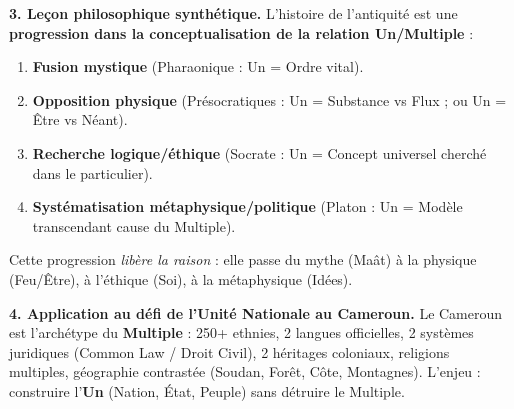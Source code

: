 \documentclass[11pt]{article}
\begin{document}
\begin{exoresolu}
\textbf{3. Leçon philosophique synthétique.}
L'histoire de l'antiquité est une \textbf{progression dans la conceptualisation de la relation Un/Multiple} :
\begin{enumerate}
    \item \textbf{Fusion mystique} (Pharaonique : Un = Ordre vital).
    \item \textbf{Opposition physique} (Présocratiques : Un = Substance vs Flux ; ou Un = Être vs Néant).
    \item \textbf{Recherche logique/éthique} (Socrate : Un = Concept universel cherché dans le particulier).
    \item \textbf{Systématisation métaphysique/politique} (Platon : Un = Modèle transcendant cause du Multiple).
\end{enumerate}
Cette progression \emph{libère la raison} : elle passe du mythe (Maât) à la physique (Feu/Être), à l'éthique (Soi), à la métaphysique (Idées).

\textbf{4. Application au défi de l'Unité Nationale au Cameroun.}
Le Cameroun est l'archétype du \textbf{Multiple} : 250+ ethnies, 2 langues officielles, 2 systèmes juridiques (Common Law / Droit Civil), 2 héritages coloniaux, religions multiples, géographie contrastée (Soudan, Forêt, Côte, Montagnes). L'enjeu : construire l'\textbf{Un} (Nation, État, Peuple) sans détruire le Multiple.


\end{exoresolu}
\end{document}
